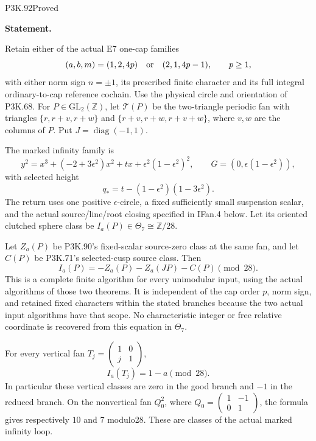 \begin{statement}{P3K.92}{Proved}
\par\medskip\noindent\textbf{Statement.}\par\nopagebreak[4]

Retain either of the actual E7 one-cap families
\[
 (a,b,m)=(1,2,4p)\quad\hbox{or}\quad(2,1,4p-1),\qquad p\ge1,
\]
with either norm sign \(n=\pm1\), its prescribed finite character and
its full integral ordinary-to-cap reference cochain. Use the physical
circle and orientation of P3K.68. For \(P\in\mathrm{GL}_2(\mathbb Z)\),
let \(\mathcal T(P)\) be the two-triangle periodic fan with triangles
\(\{r,r+v,r+w\}\) and \(\{r+v,r+w,r+v+w\}\), where \(v,w\) are the
columns of \(P\). Put \(J=\operatorname{diag}(-1,1)\).

The marked infinity family is
\[
 y^2=x^3+(-2+3\epsilon^2)x^2+t x+
                  \epsilon^2(1-\epsilon^2)^2,
 \qquad G=(0,\epsilon(1-\epsilon^2)),                 \tag{IFan.1}
\]
with selected height
\[
 q_*=t-(1-\epsilon^2)(1-3\epsilon^2).
\]
The return uses one positive \(\epsilon\)-circle, a fixed sufficiently
small suspension scalar, and the actual source/line/root closing
specified in IFan.4 below. Let its oriented clutched sphere class be
\(I_a(P)\in\Theta_7\cong\mathbb Z/28\).

Let \(Z_a(P)\) be P3K.90's fixed-scalar source-zero class at the same
fan, and let \(C(P)\) be P3K.71's selected-cusp source class. Then
\[
 \boxed{\ I_a(P)=-Z_a(P)-Z_a(JP)-C(P)\pmod {28}.\ } \tag{IFan.2}
\]
This is a complete finite algorithm for every unimodular input, using
the actual algorithms of those two theorems. It is independent of the
cap order \(p\), norm sign, and retained fixed characters within the
stated branches because the two actual input algorithms have that
scope. No characteristic integer or free relative coordinate is
recovered from this equation in \(\Theta_7\).

For every vertical fan \(T_j=\left(\begin{smallmatrix}1&0\\j&1\end{smallmatrix}\right)\),
\[
 I_a(T_j)=1-a\pmod {28}.                            \tag{IFan.3}
\]
In particular these vertical classes are zero in the good branch and
\(-1\) in the reduced branch. On the nonvertical fan \(Q_0^2\), where
\(Q_0=\left(\begin{smallmatrix}1&-1\\0&1\end{smallmatrix}\right)\),
the formula gives respectively \(10\) and \(7\) modulo28. These are
classes of the actual marked infinity loop.

\end{statement}
